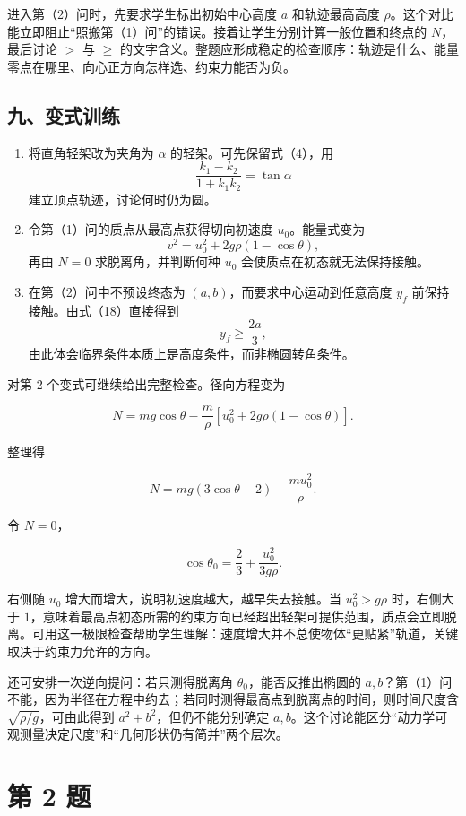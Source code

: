 \documentclass[12pt,a4paper,UTF8]{ctexart}
\newcommand{\tightlist}{\setlength{\itemsep}{0pt}\setlength{\parskip}{0pt}}
\begin{document}
进入第（2）问时，先要求学生标出初始中心高度 \(a\) 和轨迹最高高度
\(\rho\)。这个对比能立即阻止``照搬第（1）问''的错误。接着让学生分别计算一般位置和终点的
\(N\)，最后讨论 \(>\) 与 \(\geq\)
的文字含义。整题应形成稳定的检查顺序：轨迹是什么、能量零点在哪里、向心正方向怎样选、约束力能否为负。

\subsection{九、变式训练}\label{ux4e5dux53d8ux5f0fux8badux7ec3}

\begin{enumerate}
\def\labelenumi{\arabic{enumi}.}
\tightlist
\item
  将直角轻架改为夹角为 \(\alpha\) 的轻架。可先保留式（4），用
  \[\frac{k_1-k_2}{1+k_1k_2}=\tan\alpha\] 建立顶点轨迹，讨论何时仍为圆。
\item
  令第（1）问的质点从最高点获得切向初速度 \(u_0\)。能量式变为
  \[v^2=u_0^2+2g\rho(1-\cos\theta),\] 再由 \(N=0\) 求脱离角，并判断何种
  \(u_0\) 会使质点在初态就无法保持接触。
\item
  在第（2）问中不预设终态为 \((a,b)\)，而要求中心运动到任意高度 \(y_f\)
  前保持接触。由式（18）直接得到 \[y_f\geq\frac{2a}{3},\]
  由此体会临界条件本质上是高度条件，而非椭圆转角条件。
\end{enumerate}

对第 2 个变式可继续给出完整检查。径向方程变为

\[N=mg\cos\theta-\frac m\rho
\left[u_0^2+2g\rho(1-\cos\theta)\right].\]

整理得

\[N=mg(3\cos\theta-2)-\frac{mu_0^2}{\rho}.\]

令 \(N=0\)，

\[\cos\theta_0=\frac23+\frac{u_0^2}{3g\rho}.\]

右侧随 \(u_0\) 增大而增大，说明初速度越大，越早失去接触。当
\(u_0^2>g\rho\) 时，右侧大于
\(1\)，意味着最高点初态所需的约束方向已经超出轻架可提供范围，质点会立即脱离。可用这一极限检查帮助学生理解：速度增大并不总使物体``更贴紧''轨道，关键取决于约束力允许的方向。

还可安排一次逆向提问：若只测得脱离角 \(\theta_0\)，能否反推出椭圆的
\(a,b\)？第（1）问不能，因为半径在方程中约去；若同时测得最高点到脱离点的时间，则时间尺度含
\(\sqrt{\rho/g}\)，可由此得到 \(a^2+b^2\)，但仍不能分别确定
\(a,b\)。这个讨论能区分``动力学可观测量决定尺度''和``几何形状仍有简并''两个层次。

\newpage

\section{第 2 题}\label{ux7b2c-2-ux9898}
\end{document}
